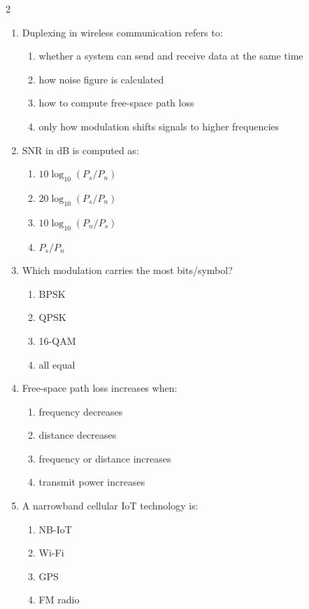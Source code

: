 \begin{multicols}{2}
\begin{enumerate}[leftmargin=*, itemsep=0.4em]
\item Duplexing in wireless communication refers to:
\begin{enumerate}[label=\alph*)]
\item whether a system can send and receive data at the same time
\item how noise figure is calculated
\item how to compute free-space path loss
\item only how modulation shifts signals to higher frequencies
\end{enumerate}

\item SNR in dB is computed as:
\begin{enumerate}[label=\alph*)]
\item $10\log_{10}(P_s/P_n)$
\item $20\log_{10}(P_s/P_n)$
\item $10\log_{10}(P_n/P_s)$
\item $P_s/P_n$
\end{enumerate}

\item Which modulation carries the most bits/symbol?
\begin{enumerate}[label=\alph*)]
\item BPSK
\item QPSK
\item 16-QAM
\item all equal
\end{enumerate}

\item Free-space path loss increases when:
\begin{enumerate}[label=\alph*)]
\item frequency decreases
\item distance decreases
\item frequency or distance increases
\item transmit power increases
\end{enumerate}

\item A narrowband cellular IoT technology is:
\begin{enumerate}[label=\alph*)]
\item NB-IoT
\item Wi-Fi
\item GPS
\item FM radio
\end{enumerate}


\end{enumerate}
\end{multicols}
